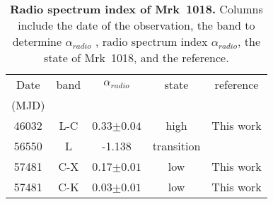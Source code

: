 \begin{table}
\centering
\caption{{\bf Radio spectrum index of Mrk~1018.} Columns include the date of the observation, the band to determine $\alpha_{radio}$ , radio spectrum index $\alpha_{radio}$, the state of Mrk~1018, and the reference. }
\label{tab:table3}
\begin{tabular}{ccccc}
\hline
\hline
  
 Date &   band & $\alpha_{radio}$ &state  &  reference \\ 
 (MJD)&                   &                            &                 &                              
 \\ \hline

46032 & L-C & 0.33$\pm 0.04$ & high & This work \\ 
56550 & L & -1.138 & transition & \citet{2016MNRAS.460.4433H} \\ 
57481 & C-X & 0.17$\pm 0.01$ & low & This work \\ \hline
57481 & C-K & 0.03$\pm 0.01$ & low & This work \\ \hline

\end{tabular}
\end{table}